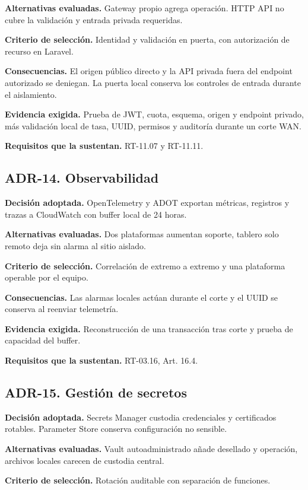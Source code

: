 \textbf{Alternativas evaluadas.} Gateway propio agrega operación. HTTP API no cubre la validación y entrada privada requeridas.

\textbf{Criterio de selección.} Identidad y validación en puerta, con autorización de recurso en Laravel.

\textbf{Consecuencias.} El origen público directo y la API privada fuera del endpoint autorizado se deniegan. La puerta local conserva los controles de entrada durante el aislamiento.

\textbf{Evidencia exigida.} Prueba de JWT, cuota, esquema, origen y endpoint privado, más validación local de tasa, UUID, permisos y auditoría durante un corte WAN.

\textbf{Requisitos que la sustentan.} RT-11.07 y RT-11.11.

\subsection*{ADR-14. Observabilidad}
\label{sub:adr-14}
\textbf{Decisión adoptada.} OpenTelemetry y ADOT exportan métricas, registros y trazas a CloudWatch con buffer local de 24 horas.

\textbf{Alternativas evaluadas.} Dos plataformas aumentan soporte, tablero solo remoto deja sin alarma al sitio aislado.

\textbf{Criterio de selección.} Correlación de extremo a extremo y una plataforma operable por el equipo.

\textbf{Consecuencias.} Las alarmas locales actúan durante el corte y el UUID se conserva al reenviar telemetría.

\textbf{Evidencia exigida.} Reconstrucción de una transacción tras corte y prueba de capacidad del buffer.

\textbf{Requisitos que la sustentan.} RT-03.16, Art. 16.4.

\subsection*{ADR-15. Gestión de secretos}
\label{sub:adr-15}
\textbf{Decisión adoptada.} Secrets Manager custodia credenciales y certificados rotables. Parameter Store conserva configuración no sensible.

\textbf{Alternativas evaluadas.} Vault autoadministrado añade desellado y operación, archivos locales carecen de custodia central.

\textbf{Criterio de selección.} Rotación auditable con separación de funciones.

